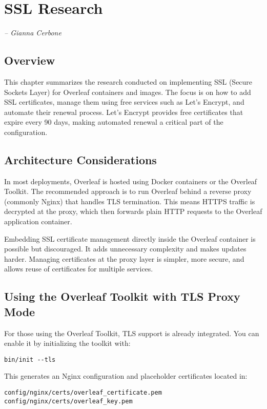 \chapter{SSL Research}
\small{\textit{-- Gianna Cerbone}}
\label{Chapter:SSLResearch}

\section{Overview}

This chapter summarizes the research conducted on implementing SSL (Secure Sockets Layer) for Overleaf containers and images. The focus is on how to add SSL certificates, manage them using free services such as Let’s Encrypt, and automate their renewal process. Let’s Encrypt provides free certificates that expire every 90 days, making automated renewal a critical part of the configuration.

\section{Architecture Considerations}

In most deployments, Overleaf is hosted using Docker containers or the Overleaf Toolkit. The recommended approach is to run Overleaf behind a reverse proxy (commonly Nginx) that handles TLS termination. This means HTTPS traffic is decrypted at the proxy, which then forwards plain HTTP requests to the Overleaf application container.

Embedding SSL certificate management directly inside the Overleaf container is possible but discouraged. It adds unnecessary complexity and makes updates harder. Managing certificates at the proxy layer is simpler, more secure, and allows reuse of certificates for multiple services.

\section{Using the Overleaf Toolkit with TLS Proxy Mode}

For those using the Overleaf Toolkit, TLS support is already integrated. You can enable it by initializing the toolkit with:

\begin{verbatim}
bin/init --tls
\end{verbatim}

This generates an Nginx configuration and placeholder certificates located in:
\begin{verbatim}
config/nginx/certs/overleaf_certificate.pem
config/nginx/certs/overleaf_key.pem
\end{verbatim}

